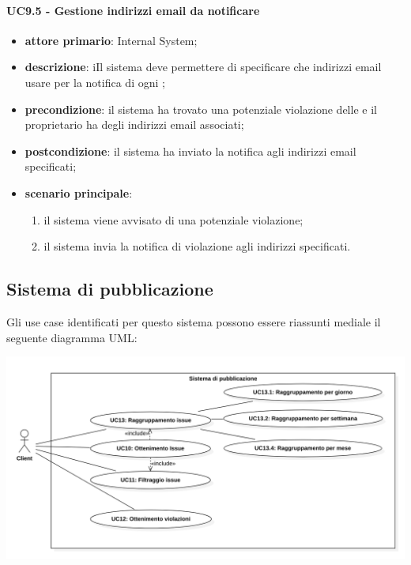 \paragraph{UC9.5 -  Gestione indirizzi email da notificare}
\begin{itemize}
	\item \textbf{attore primario}: Internal System;
	\item \textbf{descrizione}: iIl sistema deve permettere di specificare che indirizzi email usare per la notifica di ogni ; 
	\item \textbf{precondizione}: il sistema ha trovato una potenziale violazione delle  e il  proprietario ha degli indirizzi email associati;
	\item \textbf{postcondizione}: il sistema ha inviato la notifica agli indirizzi email specificati;
	\item \textbf{scenario principale}: 
	\begin{enumerate}
		\item il sistema viene avvisato di una potenziale violazione;
		\item il sistema invia la notifica di violazione agli indirizzi specificati.
	\end{enumerate}
\end{itemize}

\subsection{Sistema di pubblicazione}
Gli use case identificati per questo sistema possono essere riassunti mediale il seguente diagramma UML:
\begin{center}
	\includegraphics[keepaspectratio = true, width=15cm]{immagini/uc/7.png}
\end{center}
